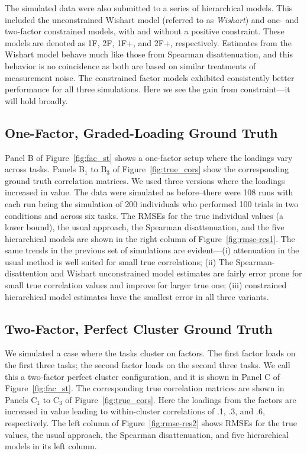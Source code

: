 \documentclass[man, 12pt]{apa7} %
\begin{document}
The simulated data were also submitted to a series of hierarchical models. This included the unconstrained Wishart model (referred to as \textit{Wishart}) and one- and two-factor constrained models,  with and without a positive constraint. These models are denoted as 1F, 2F, 1F+, and 2F+, respectively. Estimates from the Wishart model behave much like those from Spearman disattenuation, and this behavior is no coincidence as both are based on similar treatments of measurement noise. The constrained factor models exhibited consistently better performance for all three simulations.  Here we see the gain from constraint---it will hold broadly.

\subsection{One-Factor, Graded-Loading Ground Truth}

Panel B of Figure~\ref{fig:fac_st} shows a one-factor setup where the loadings vary across tasks. Panels B$_1$ to B$_3$ of Figure~\ref{fig:true_cors} show the corresponding ground truth correlation matrices.  We used three versions where the loadings increased in value. The data were simulated as before--there were 108 runs with each run being the simulation of 200 individuals who performed 100 trials in two conditions and across six tasks. The RMSEs for the true individual values (a lower bound), the usual approach, the Spearman disattenuation, and the five hierarchical models are shown in the right column of Figure~\ref{fig:rmse-res1}. The same trends in the previous set of simulations are evident---(i) attenuation in the usual method is well suited for small true correlations; (ii) The Spearman-disattention and Wishart unconstrained model estimates are fairly error prone for small true correlation values and improve for larger true one; (iii) constrained hierarchical model estimates have the smallest error in all three variants.

\subsection{Two-Factor, Perfect Cluster Ground Truth}


We simulated a case where the tasks cluster on factors.  The first factor loads on the first three tasks; the second factor loads on the second three tasks.  We call this a two-factor perfect cluster configuration, and it is shown in Panel C of Figure~\ref{fig:fac_st}.  The corresponding true correlation matrices are shown in Panels C$_1$ to C$_3$ of Figure~\ref{fig:true_cors}.  Here the loadings from the factors are increased in value leading to within-cluster correlations of .1, .3, and .6, respectively. The left column of Figure~\ref{fig:rmse-res2} shows RMSEs for the true values, the usual approach, the Spearman disattenuation, and five hierarchical models in its left column.
\end{document}
